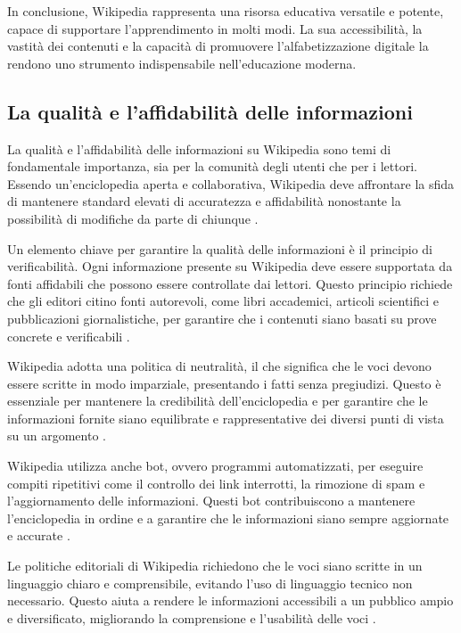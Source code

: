 \documentclass[12pt,a4paper]{report}
\begin{document}
In conclusione, Wikipedia rappresenta una risorsa educativa versatile e potente, capace di supportare l'apprendimento in molti modi. La sua accessibilità, la vastità dei contenuti e la capacità di promuovere l'alfabetizzazione digitale la rendono uno strumento indispensabile nell'educazione moderna.

\subsection{La qualità e l'affidabilità delle informazioni}

La qualità e l'affidabilità delle informazioni su Wikipedia sono temi di fondamentale importanza, sia per la comunità degli utenti che per i lettori. Essendo un'enciclopedia aperta e collaborativa, Wikipedia deve affrontare la sfida di mantenere standard elevati di accuratezza e affidabilità nonostante la possibilità di modifiche da parte di chiunque \cite{reagle2010good}.

Un elemento chiave per garantire la qualità delle informazioni è il principio di verificabilità. Ogni informazione presente su Wikipedia deve essere supportata da fonti affidabili che possono essere controllate dai lettori. Questo principio richiede che gli editori citino fonti autorevoli, come libri accademici, articoli scientifici e pubblicazioni giornalistiche, per garantire che i contenuti siano basati su prove concrete e verificabili \cite{denning2005wikipedia}.

Wikipedia adotta una politica di neutralità, il che significa che le voci devono essere scritte in modo imparziale, presentando i fatti senza pregiudizi. Questo è essenziale per mantenere la credibilità dell'enciclopedia e per garantire che le informazioni fornite siano equilibrate e rappresentative dei diversi punti di vista su un argomento \cite{reagle2010good}.

Wikipedia utilizza anche bot, ovvero programmi automatizzati, per eseguire compiti ripetitivi come il controllo dei link interrotti, la rimozione di spam e l'aggiornamento delle informazioni. Questi bot contribuiscono a mantenere l'enciclopedia in ordine e a garantire che le informazioni siano sempre aggiornate e accurate \cite{history_of_wikis}.

Le politiche editoriali di Wikipedia richiedono che le voci siano scritte in un linguaggio chiaro e comprensibile, evitando l'uso di linguaggio tecnico non necessario. Questo aiuta a rendere le informazioni accessibili a un pubblico ampio e diversificato, migliorando la comprensione e l'usabilità delle voci \cite{reagle2010good}.
\end{document}
